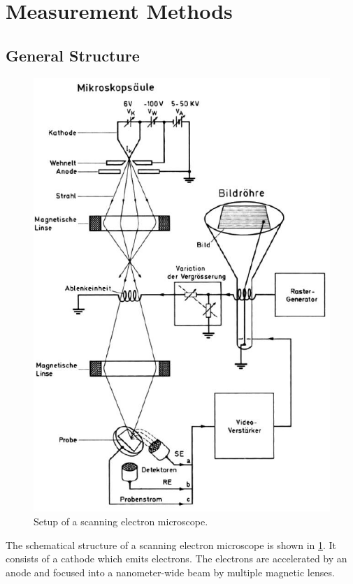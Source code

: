 \section{Measurement Methods}

\subsection{General Structure}
\begin{figure}[H]
	\centering
	\includegraphics[width=0.95\linewidth]{../assets/aufbau.png}
	\caption{Setup of a scanning electron microscope. }
	\label{fig:general_structure}
\end{figure}
The schematical structure of a scanning electron microscope is shown in
\cref{fig:general_structure}. It consists of a cathode which emits
electrons. 
The electrons are accelerated by an anode and focused into a 
nanometer-wide beam by multiple magnetic lenses.

